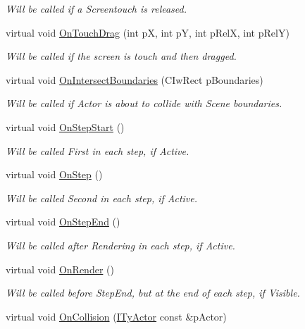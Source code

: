 \begin{DoxyCompactItemize}
\begin{DoxyCompactList}\small\item\em Will be called if a Screentouch is released. \end{DoxyCompactList}\item 
virtual void \hyperlink{class_i_ty_actor_ad07610fc8cd2e0ade09d777979102a22}{OnTouchDrag} (int pX, int pY, int pRelX, int pRelY)
\begin{DoxyCompactList}\small\item\em Will be called if the screen is touch and then dragged. \end{DoxyCompactList}\item 
virtual void \hyperlink{class_i_ty_actor_a9da03663a14f091ce23a5adae98e2302}{OnIntersectBoundaries} (CIwRect pBoundaries)
\begin{DoxyCompactList}\small\item\em Will be called if Actor is about to collide with Scene boundaries. \end{DoxyCompactList}\item 
virtual void \hyperlink{class_i_ty_actor_aeed7b53859c91f8be589ff441f36852d}{OnStepStart} ()
\begin{DoxyCompactList}\small\item\em Will be called First in each step, if Active. \end{DoxyCompactList}\item 
virtual void \hyperlink{class_i_ty_actor_a78ac709f1fdbd9fba59180337be44a7a}{OnStep} ()
\begin{DoxyCompactList}\small\item\em Will be called Second in each step, if Active. \end{DoxyCompactList}\item 
virtual void \hyperlink{class_i_ty_actor_aa539311a3f8cf47dd325f6cb6e7413a6}{OnStepEnd} ()
\begin{DoxyCompactList}\small\item\em Will be called after Rendering in each step, if Active. \end{DoxyCompactList}\item 
virtual void \hyperlink{class_i_ty_actor_ac5a0f1ef9aca4cf49893171c130abb9c}{OnRender} ()
\begin{DoxyCompactList}\small\item\em Will be called before StepEnd, but at the end of each step, if Visible. \end{DoxyCompactList}\item 
virtual void \hyperlink{class_i_ty_actor_a88b1d350c4649d2df9e358f15fbca9b2}{OnCollision} (\hyperlink{class_i_ty_actor}{ITyActor} const \&pActor)

\end{DoxyCompactItemize}
